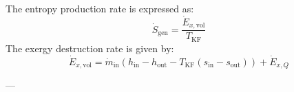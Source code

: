 The entropy production rate is expressed as:  
\[
\dot{S}_{\text{gen}} = \frac{\dot{E}_{x,\text{vol}}}{T_{\text{KF}}}
\]  
The exergy destruction rate is given by:  
\[
\dot{E}_{x,\text{vol}} = \dot{m}_{\text{in}} \left( h_{\text{in}} - h_{\text{out}} - T_{\text{KF}} \left( s_{\text{in}} - s_{\text{out}} \right) \right) + \dot{E}_{x,Q}
\]  

---